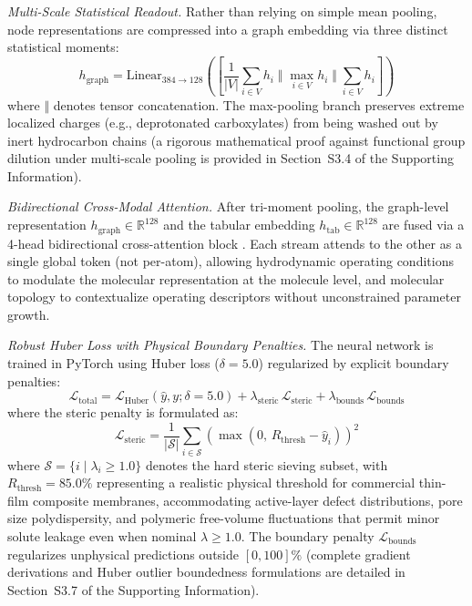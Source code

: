 \documentclass[11pt]{article}
\begin{document}
\textit{Multi-Scale Statistical Readout.} Rather than relying on simple mean pooling, node representations are compressed into a graph embedding via three distinct statistical moments:
\begin{equation}
h_{\mathrm{graph}} = \mathrm{Linear}_{384 \to 128} \left( \left[ \frac{1}{|V|}\sum_{i \in V} h_i \; \Big\Vert \; \max_{i \in V} h_i \; \Big\Vert \; \sum_{i \in V} h_i \right] \right)
\label{eq:readout}
\end{equation}
where $\Vert$ denotes tensor concatenation. The max-pooling branch preserves extreme localized charges (e.g., deprotonated carboxylates) from being washed out by inert hydrocarbon chains (a rigorous mathematical proof against functional group dilution under multi-scale pooling is provided in Section~S3.4 of the Supporting Information).

\textit{Bidirectional Cross-Modal Attention.} After tri-moment pooling, the graph-level representation $h_{\mathrm{graph}} \in \mathbb{R}^{128}$ and the tabular embedding $h_{\mathrm{tab}} \in \mathbb{R}^{128}$ are fused via a 4-head bidirectional cross-attention block \cite{vaswani2017}. Each stream attends to the other as a single global token (not per-atom), allowing hydrodynamic operating conditions to modulate the molecular representation at the molecule level, and molecular topology to contextualize operating descriptors without unconstrained parameter growth.

\textit{Robust Huber Loss with Physical Boundary Penalties.} The neural network is trained in PyTorch \cite{paszke2019} using Huber loss ($\delta = 5.0$) regularized by explicit boundary penalties:
\begin{equation}
\mathcal{L}_{\mathrm{total}} = \mathcal{L}_{\mathrm{Huber}}(\hat{y}, y; \delta = 5.0) + \lambda_{\mathrm{steric}}\,\mathcal{L}_{\mathrm{steric}} + \lambda_{\mathrm{bounds}}\,\mathcal{L}_{\mathrm{bounds}}
\label{eq:loss}
\end{equation}
where the steric penalty is formulated as:
\begin{equation}
\mathcal{L}_{\mathrm{steric}} = \frac{1}{|\mathcal{S}|} \sum_{i \in \mathcal{S}} \left( \max\left(0,\, R_{\mathrm{thresh}} - \hat{y}_i\right) \right)^2
\label{eq:steric_loss}
\end{equation}
where $\mathcal{S} = \{i \mid \lambda_i \ge 1.0\}$ denotes the hard steric sieving subset, with $R_{\mathrm{thresh}} = 85.0\%$ representing a realistic physical threshold for commercial thin-film composite membranes, accommodating active-layer defect distributions, pore size polydispersity, and polymeric free-volume fluctuations that permit minor solute leakage even when nominal $\lambda \ge 1.0$. The boundary penalty $\mathcal{L}_{\mathrm{bounds}}$ regularizes unphysical predictions outside $[0, 100]\%$ (complete gradient derivations and Huber outlier boundedness formulations are detailed in Section~S3.7 of the Supporting Information).
\end{document}

